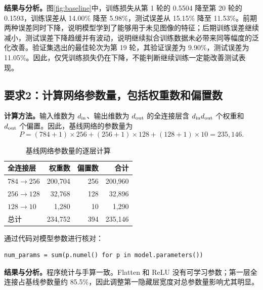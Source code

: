\documentclass[UTF8,11pt,a4paper,fontset=fandol]{ctexart}
\newcommand{\question}[1]{\Needspace{14\baselineskip}\subsection{#1}}
\begin{document}
\textbf{结果与分析。}图\ref{fig:baseline}中，训练损失从第 1 轮的 0.5504 降至第 20 轮的 0.1593，训练误差从 14.00\% 降至 5.98\%，测试误差从 15.15\% 降至 11.53\%。前期两种误差同时下降，说明模型学到了能够用于未见图像的特征；后期训练误差继续减小，测试误差下降趋缓并有波动，说明继续拟合训练数据未必带来同等幅度的泛化改善。验证集选出的最佳轮次为第 19 轮，其验证误差为 9.90\%，测试误差为 11.05\%。因此，仅凭训练损失仍在下降，不能判断继续训练一定能改善测试表现。

\question{要求2：计算网络参数量，包括权重数和偏置数}
\textbf{计算方法。}输入维数为 $d_{\rm in}$、输出维数为 $d_{\rm out}$ 的全连接层含 $d_{\rm in}d_{\rm out}$ 个权重和 $d_{\rm out}$ 个偏置。因此，基线网络的参数量为
\begin{equation}
P=(784+1)\times256+(256+1)\times128+(128+1)\times10=235,146.
\end{equation}
\begin{table}[H]\centering\small
\caption{基线网络参数量的逐层计算}
\begin{tabular}{lrrr}\toprule
全连接层 & 权重数 & 偏置数 & 合计 \\\midrule
$784\to256$ & 200,704 & 256 & 200,960 \\
$256\to128$ & 32,768 & 128 & 32,896 \\
$128\to10$ & 1,280 & 10 & 1,290 \\\midrule
总计 & 234,752 & 394 & 235,146 \\
\bottomrule\end{tabular}
\end{table}
通过代码对模型参数进行核对：
\par\noindent\begin{minipage}{\linewidth}
\begin{lstlisting}
num_params = sum(p.numel() for p in model.parameters())
\end{lstlisting}
\end{minipage}\par
\textbf{结果与分析。}程序统计与手算一致。Flatten 和 ReLU 没有可学习参数；第一层全连接占基线参数量约 85.5\%，因此调整第一隐藏层宽度对总参数量影响尤其明显。
\end{document}
